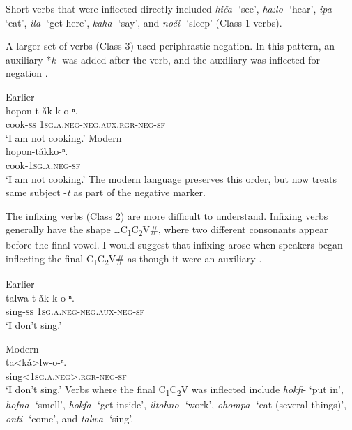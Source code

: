 \documentclass[output=paper,colorlinks,citecolor=brown]{langscibook}
\begin{document}
\noindent Short verbs that were inflected directly included \textit{hiča}- ‘see’, \textit{ha:lo}- ‘hear’, \textit{ipa}- ‘eat’, \textit{ila}- ‘get here’, \textit{kaha}- ‘say’, and \textit{noči}- ‘sleep’ (Class 1 verbs).

A larger set of verbs (Class 3) used periphrastic negation. In this pattern, an auxiliary *\textit{k}- was added after the verb, and the auxiliary was inflected for negation .

\ea\label{ex:koa:68}
    \ea Earlier{\label{ex:koa:68a}\\
        \gll hopon-t  ǎk-k-o-ⁿ.\\ 
             cook-\textsc{ss}  1\textsc{sg.a}.\textsc{neg}-\textsc{neg}.\textsc{aux.rgr}-\textsc{neg}-\textsc{sf} \\
        \glt ‘I am not cooking.’} 
    \ex Modern {\label{ex:koa:68b}\\
        \gll hopon-tǎkko-ⁿ.\\
             cook-1\textsc{sg.a}.\textsc{neg}-\textsc{sf} \\
        \glt ‘I am not cooking.’}
    \z
\z 
The modern language preserves this order, but now treats same subject -\textit{t} as part of the negative marker.

The infixing verbs (Class 2) are more difficult to understand. Infixing verbs generally have the shape …C\textsubscript{1}C\textsubscript{2}V\#, where two different consonants appear before the final vowel. I would suggest that infixing arose when speakers began inflecting the final C\textsubscript{1}C\textsubscript{2}V\# as though it were an auxiliary .


\ea\label{ex:koa:69}
    \ea Earlier{\label{ex:koa:69a}\\
        \gll talwa-t ǎk-k-o-ⁿ. \\ 
             sing-\textsc{ss} 1\textsc{sg.a}.\textsc{neg}-\textsc{neg}.\textsc{aux}-\textsc{neg}-\textsc{sf} \\
        \glt ‘I don’t sing.’ } 
    
    \ex Modern {\label{ex:koa:69b}\\
        \gll ta<kǎ>lw-o-ⁿ.\\
             sing<1\textsc{sg.a}.\textsc{neg}>.\textsc{rgr}-\textsc{neg}-\textsc{sf} \\
        \glt ‘I don’t sing.’}
    \z
\z 
Verbs where the final C\textsubscript{1}C\textsubscript{2}V was inflected include \textit{hokfi}- ‘put in’, \textit{hofna}- ‘smell’, \textit{hokfa}- ‘get inside’, \textit{iltohno}- ‘work’, \textit{ohompa}- ‘eat (several things)’, \textit{onti}- ‘come’, and \textit{talwa}- ‘sing’. 
\end{document}
